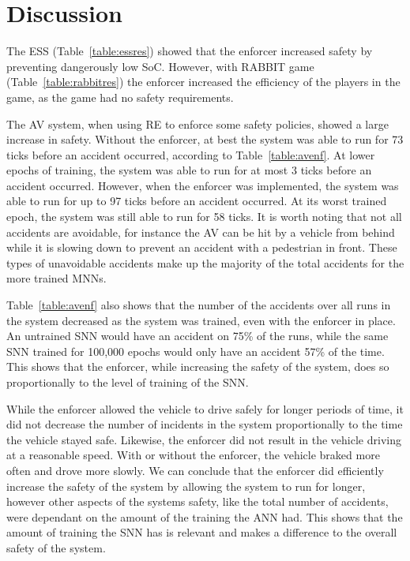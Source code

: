 \section{Discussion}
\label{sec:conclusion}

The \ac{ESS} (Table~\ref{table:essres}) showed that the enforcer increased safety by preventing dangerously low \acf{SoC}.
However, with RABBIT game (Table~\ref{table:rabbitres}) the enforcer increased the efficiency of the players in the game, as the game had no safety requirements.

The \ac{AV} system, when using \ac{RE} to enforce some safety policies, showed a large increase in safety.
Without the enforcer, at best the system was able to run for 73 ticks before an accident occurred, according to Table~\ref{table:avenf}.
At lower epochs of training, the system was able to run for at most 3 ticks before an accident occurred.
However, when the enforcer was implemented, the system was able to run for up to 97 ticks before an accident occurred.
At its worst trained epoch, the system was still able to run for 58 ticks.
It is worth noting that not all accidents are avoidable, for instance the \ac{AV} can be hit by a vehicle from behind while it is slowing down to prevent an accident with a pedestrian in front.
These types of unavoidable accidents make up the majority of the total accidents for the more trained \acp{MNN}.

Table~\ref{table:avenf} also shows that the number of the accidents over all runs in the system decreased as the system was trained, even with the enforcer in place.
An untrained \ac{SNN} would have an accident on 75\% of the runs, while the same \ac{SNN} trained for 100,000 epochs would only have an accident 57\% of the time.
This shows that the enforcer, while increasing the safety of the system, does so proportionally to the level of training of the \ac{SNN}.

While the enforcer allowed the vehicle to drive safely for longer periods of time, it did not decrease the number of incidents in the system proportionally to the time the vehicle stayed safe.
Likewise, the enforcer did not result in the vehicle driving at a reasonable speed.
With or without the enforcer, the vehicle braked more often and drove more slowly.
We can conclude that the enforcer did efficiently increase the safety of the system by allowing the system to run for longer, however other aspects of the systems safety, like the total number of accidents, were dependant on the amount of the training the \ac{ANN} had.
This shows that the amount of training the \ac{SNN} has is relevant and makes a difference to the overall safety of the system.

